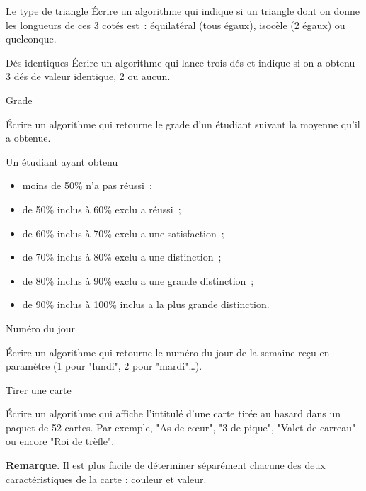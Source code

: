 		\begin{Exercice}{Le type de triangle}
			Écrire un algorithme qui indique si un triangle
			dont on donne les longueurs de ces 3 cotés est~:
			équilatéral (tous égaux), isocèle (2 égaux)
			ou quelconque.
		\end{Exercice}

		\begin{Exercice}{Dés identiques}
			Écrire un algorithme qui lance trois dés
			et indique si on a obtenu 3 dés de valeur identique,
			2 ou aucun.
		\end{Exercice}

		\begin{Exercice}{Grade}

			Écrire un algorithme qui retourne le grade d’un étudiant 
			suivant la moyenne qu’il a obtenue.

			Un étudiant ayant obtenu 
			\begin{itemize}
				\item moins de 50\% n’a pas réussi~;
				\item de 50\% inclus à 60\% exclu a réussi~;
				\item de 60\% inclus à 70\% exclu a une satisfaction~;
				\item de 70\% inclus à 80\% exclu a une distinction~;
				\item de 80\% inclus à 90\% exclu a une grande distinction~;
				\item de 90\% inclus à 100\% inclus a la plus grande distinction.
			\end{itemize}
		\end{Exercice}


		\begin{Exercice}{Numéro du jour}

			Écrire un algorithme qui retourne le numéro du jour de la semaine
			reçu en paramètre (1 pour "lundi", 2 pour "mardi"\dots).
		\end{Exercice}

		\begin{Exercice}{Tirer une carte}

			Écrire un algorithme qui affiche l’intitulé d’une carte
			tirée au hasard dans un paquet de 52 cartes.
			Par exemple, "As de cœur", "3 de pique", "Valet de carreau"
			ou encore "Roi de trèfle".

			\textbf{Remarque}. Il est plus facile de déterminer séparément
			chacune des deux caractéristiques de la carte : couleur et valeur.
		\end{Exercice}

